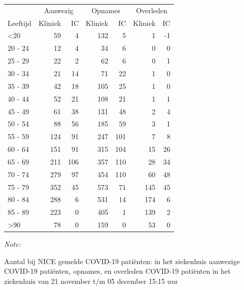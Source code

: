 \documentclass[
  english,
  man,floatsintext]{apa6}
\begin{document}
\begin{table}
\centering\begingroup\fontsize{10}{12}\selectfont

\begin{threeparttable}
\begin{tabular}{lrrrrrr}
\toprule
\multicolumn{1}{c}{ } & \multicolumn{2}{c}{Aanwezig} & \multicolumn{2}{c}{Opnames} & \multicolumn{2}{c}{Overleden} \\
\cmidrule(l{3pt}r{3pt}){2-3} \cmidrule(l{3pt}r{3pt}){4-5} \cmidrule(l{3pt}r{3pt}){6-7}
Leeftijd & Kliniek & IC & Kliniek & IC & Kliniek & IC\\
\midrule
<20 & 59 & 4 & 132 & 5 & 1 & -1\\
20 - 24 & 12 & 4 & 34 & 6 & 0 & 0\\
25 - 29 & 22 & 2 & 62 & 6 & 0 & 1\\
30 - 34 & 21 & 14 & 71 & 22 & 1 & 0\\
35 - 39 & 42 & 18 & 105 & 25 & 1 & 0\\
40 - 44 & 52 & 21 & 108 & 21 & 1 & 1\\
45 - 49 & 61 & 38 & 131 & 48 & 2 & 4\\
50 - 54 & 88 & 56 & 185 & 59 & 3 & 1\\
55 - 59 & 124 & 91 & 247 & 101 & 7 & 8\\
60 - 64 & 151 & 91 & 315 & 104 & 15 & 26\\
65 - 69 & 211 & 106 & 357 & 110 & 28 & 34\\
70 - 74 & 279 & 97 & 454 & 110 & 60 & 48\\
75 - 79 & 352 & 45 & 573 & 71 & 145 & 45\\
80 - 84 & 288 & 6 & 531 & 14 & 174 & 6\\
85 - 89 & 223 & 0 & 405 & 1 & 139 & 2\\
>90 & 78 & 0 & 159 & 0 & 53 & 0\\
\bottomrule
\end{tabular}
\begin{tablenotes}
\item \textit{Note: } 
\item Aantal bij NICE gemelde COVID-19 patiënten: in het ziekenhuis aanwezige COVID-19 patiënten, opnames, en overleden COVID-19 patiënten in het ziekenhuis van 21 november t/m 05 december 15:15 uur
\end{tablenotes}
\end{threeparttable}
\endgroup{}
\end{table}

\newpage
\end{document}
